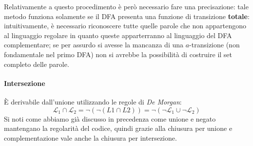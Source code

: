 \documentclass[class=book, crop=false, oneside, 12pt]{standalone}
\begin{document}
Relativamente a questo procedimento è però necessario fare una precisazione: tale metodo funziona solamente se il DFA presenta una funzione di transizione \textbf{totale}: intuitivamente, è necessario riconoscere tutte quelle parole che non appartengono al linguaggio regolare in quanto queste apparterranno al linguaggio del DFA complementare; se per assurdo si avesse la mancanza di una \(a\)-transizione (non fondamentale nel primo DFA) non si avrebbe la possibilità di costruire il set completo delle parole.

\paragraph{Intersezione}
È derivabile dall'unione utilizzando le regole di \emph{De Morgan}: 
\begin{equation*}
    \mathcal{L}_1 \cap \mathcal{L}_2 = \lnot (\lnot (L1 \cap L2)) = \lnot (\lnot \mathcal{L}_1 \cup \lnot \mathcal{L}_2)
\end{equation*}
Si noti come abbiamo già discusso in precedenza come unione e negato mantengano la regolarità del codice, quindi grazie alla chiusura per unione e complementazione vale anche la chiusura per intersezione.
\end{document}
